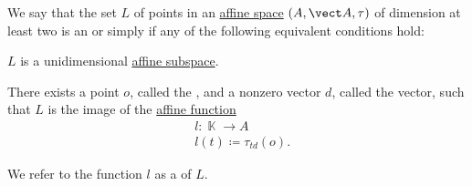 \begin{definition}\label{def:affine_line}\mimprovised
  We say that the set \( L \) of points in an \hyperref[def:affine_space]{affine space} \( (A, \vect A, \tau) \) of dimension at least two is an  or simply  if any of the following equivalent conditions hold:

  \begin{thmenum}
     \( L \) is a unidimensional \hyperref[def:affine_subspace]{affine subspace}.

     There exists a point \( o \), called the , and a nonzero vector \( d \), called the  vector, such that \( L \) is the image of the \hyperref[def:affine_operator]{affine function}
    \begin{equation}\label{eq:def:affine_line/parametric}
      \begin{aligned}
        &l: \BbbK \to A \\
        &l(t) \coloneqq \tau_{t d}(o).
      \end{aligned}
    \end{equation}

    We refer to the function \( l \) as a  of \( L \).
  \end{thmenum}
\end{definition}
